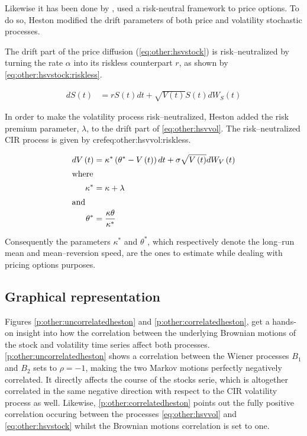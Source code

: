 \documentclass[12pt]{report}
\newcommand{\Bmsub}[1]{W_{#1}\left(t\right)}
\newcommand{\St}{S\left(t\right)}
\newcommand{\Vt}{V\left(t\right)}
\newcommand{\HSVstockriskless}{
  d\St &= r \St dt + \sqrt{\Vt} \St d \Bmsub{S}
}
\newcommand{\HSVvolriskless}{
  d\Vt &= \kappa^{*} \left(\theta^{*} - \Vt \right) dt + \sigma \sqrt{\Vt} d \Bmsub{V}
}
\begin{document}
Likewise it has been done by \citet{bs}, \citet{heston1993} used a risk-neutral framework to price options.
To do so, Heston modified the drift parameters of both price and volatility stochastic processes.

The drift part of the price diffusion (\cref{eq:other:hsvstock}) is risk--neutralized by turning the rate $\alpha$ into its riskless counterpart $r$, as shown by \cref{eq:other:hsvstock:riskless}.

\begin{align}
    \HSVstockriskless \label{eq:other:hsvstock:riskless}
\end{align}

In order to make the volatility process risk--neutralized, Heston added the risk premium parameter, $\lambda$, to the drift part of \cref{eq:other:hsvvol}. The risk--neutralized CIR process is given by cref{eq:other:hsvvol:riskless}.

\begin{align}
    \HSVvolriskless \label{eq:other:hsvvol:riskless} \\
    \intertext{where}
    \kappa^{*} & = \kappa + \lambda \label{eq:other:kappa:riskless} \\
    \intertext{and}
    \theta^{*} & = \frac{\kappa \theta}{\kappa^{*}} \label{eq:other:theta:riskless}
\end{align}

Consequently the parameters $\kappa^{*}$ and $\theta^{*}$, which respectively denote the long--run mean and mean--reversion speed, are the ones to estimate while dealing with pricing options purposes. 

\subsection{Graphical representation}
\label{sub:other:heston:graphical}   

Figures \ref{p:other:uncorrelatedheston} and \ref{p:other:correlatedheston}, get a hands-on insight into how the correlation between the underlying Brownian motions of the stock and volatility time series affect both processes.
\cref{p:other:uncorrelatedheston} shows a correlation between the Wiener processes $B_1$ and $B_2$ sets to $\rho = -1$, making the two Markov motions perfectly negatively correlated. 
It directly affects the course of the stocks serie, which is altogether correlated in the same negative direction with respect to the CIR volatility process as well.
Likewise, \cref{p:other:correlatedheston} points out the fully positive correlation occuring between the processes \ref{eq:other:hsvvol} and \ref{eq:other:hsvstock} whilst the Brownian motions correlation is set to one. 
\end{document}
